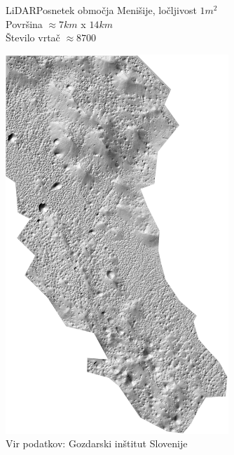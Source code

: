 \documentclass{beamer}
\begin{document}
\begin{frame}{LiDAR}{Posnetek območja Menišije, ločljivost $1m^2$ \\ Površina $\approx 7 km$ x $14 km$ \\ Število vrtač $\approx 8700$}
\begin{center}
  \hspace*{-0.79cm}\includegraphics[width=0.63\textwidth,angle=90]{slike/menisija-relief}
  \tiny{\\Vir podatkov: Gozdarski inštitut Slovenije}
\end{center}
\end{frame}
\end{document}
